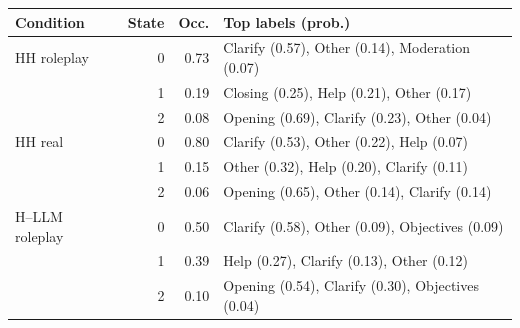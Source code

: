 \begin{tabular}{l r r l}
\toprule
Condition & State & Occ. & Top labels (prob.) \\
\midrule
HH roleplay & 0 & 0.73 & Clarify (0.57), Other (0.14), Moderation (0.07) \\
 & 1 & 0.19 & Closing (0.25), Help (0.21), Other (0.17) \\
 & 2 & 0.08 & Opening (0.69), Clarify (0.23), Other (0.04) \\
\midrule
HH real & 0 & 0.80 & Clarify (0.53), Other (0.22), Help (0.07) \\
 & 1 & 0.15 & Other (0.32), Help (0.20), Clarify (0.11) \\
 & 2 & 0.06 & Opening (0.65), Other (0.14), Clarify (0.14) \\
\midrule
H--LLM roleplay & 0 & 0.50 & Clarify (0.58), Other (0.09), Objectives (0.09) \\
 & 1 & 0.39 & Help (0.27), Clarify (0.13), Other (0.12) \\
 & 2 & 0.10 & Opening (0.54), Clarify (0.30), Objectives (0.04) \\
\bottomrule
\end{tabular}

